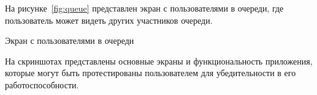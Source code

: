 На рисунке~\ref{fig:queue} представлен экран с пользователями в очереди,
где пользователь может видеть других участников очереди.

\begin{image}
    \caption{Экран с пользователями в очереди}
    \label{fig:queue}
\end{image}

На скриншотах представлены основные экраны и функциональность приложения,
которые могут быть протестированы пользователем для убедительности
в его работоспособности.

